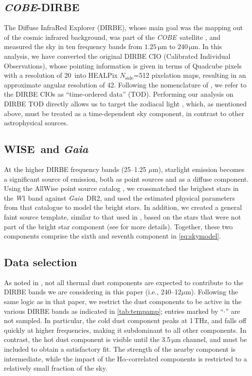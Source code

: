 \documentclass{aa}
\def\COBE{\textit{COBE}}
\def\GAIA{\textit{Gaia}}
\def\Gaia{\textit{Gaia}}
\def\WISE{WISE}
\def\nside{$N_{\mathrm{side}}$}
\begin{document}
\subsection{\COBE-DIRBE}
The Diffuse InfraRed Explorer (DIRBE), whose main goal was the mapping
out of the cosmic infrared background, was part of the
\COBE\ satellite \citep{boggess92, silverberg93}, and measured the sky
in ten frequency bands from $1.25\,\mathrm{\mu m}$ to
$240\,\mathrm{\mu m}$. In this analysis, we have converted the
original DIRBE CIO (Calibrated Individual Observations), whose
pointing information is given in terms of Quadcube pixels with a
resolution of 20\arcs\, into HEALPix \nside=512 pixelation maps,
resulting in an approximate angular resolution of 42\arcm. Following
the nomenclature of \cite{CG02_01}, we refer to the DIRBE CIOs as
``time-ordered data'' (TOD). Performing our analysis on DIRBE TOD
directly allows us to target the zodiacal light \citep{CG02_02},
which, as mentioned above, must be treated as a time-dependent sky
component, in contrast to other astrophysical sources.

\subsection{\WISE\ and \GAIA}
At the higher DIRBE frequency bands (25--1.25 $\mu$m), starlight
emission becomes a significant source of emission, both as point
sources and as a diffuse component. Using the AllWise point source
catalog \citep{CatWISE}, we crossmatched the brighest stars in the
\textit W1 band against \Gaia\ DR2, and used the estimated physical
parameters from that catalogue to model the bright stars. In addition,
we created a general faint source template, similar to that used in
\citet{hauser1998}, based on the stars that were not part of the
bright star component (see \citet{CG02_04} for more
details). Together, these two components comprise the sixth and
seventh component in \cref{eq:skymodel}.

\subsection{Data selection}
As noted in \citet{CG02_05}, not all thermal dust components are
expected to contribute to the DIRBE bands we are considering in this
paper (i.e., 240--12$\mu$m).  Following the same logic as in that
paper, we restrict the dust components to be active in the various
DIRBE bands as indicated in \cref{tab:tempamp}; entries marked by
``$\cdot$'' are not sampled. In particular, the cold dust component
peaks at 1\,THz, and falls off quickly at higher frequencies, making
it subdominant to all other components.  In contrast, the hot
dust component is visible until the 3.5\,$\mathrm{\mu m}$ channel, and
must be included to obtain a satisfactory fit. The strength of the
nearby component is intermediate, while the impact of the
H$\alpha$-correlated components is restricted to a relatively small
fraction of the sky.
\end{document}
